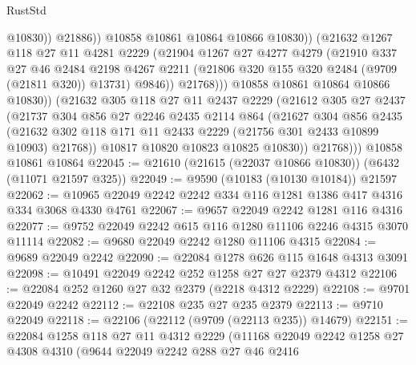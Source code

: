 \begin{lexlean}{RustStd}
\begin{coremodule}
                            @10830))
                        @21886))
                    @10858
                    @10861
                    @10864
                    @10866
                    @10830))
                (@21632
                  @1267
                  @118
                  @27
                  @11
                  @4281
                  @2229
                  (@21904
                    @1267
                    @27
                    @4277
                    @4279
                    (@21910
                      @337
                      @27
                      @46
                      @2484
                      @2198
                      @4267
                      @2211
                      (@21806 @320 @155 @320 @2484 (@9709 (@21811 @320)) @13731)
                      @9846))
                  @21768)))
            @10858
            @10861
            @10864
            @10866
            @10830))
        (@21632
          @305
          @118
          @27
          @11
          @2437
          @2229
          (@21612
            @305
            @27
            @2437
            (@21737
              @304
              @856
              @27
              @2246
              @2435
              @2114
              @864
              (@21627
                @304
                @856
                @2435
                (@21632 @302 @118 @171 @11 @2433 @2229 (@21756 @301 @2433 @10899 @10903) @21768))
              @10817
              @10820
              @10823
              @10825
              @10830))
          @21768)))
    @10858
    @10861
    @10864
@22045 := @21610 (@21615 (@22037 @10866 @10830)) (@6432 (@11071 @21597 @325))
@22049 := @9590 (@10183 (@10130 @10184)) @21597
@22062 := @10965 @22049 @2242 @2242 @334 @116 @1281 @1386 @417 @4316 @334 @3068 @4330 @4761
@22067 := @9657 @22049 @2242 @1281 @116 @4316
@22077 := @9752 @22049 @2242 @615 @116 @1280 @11106 @2246 @4315 @3070 @11114
@22082 := @9680 @22049 @2242 @1280 @11106 @4315
@22084 := @9689 @22049 @2242
@22090 := @22084 @1278 @626 @115 @1648 @4313 @3091
@22098 := @10491 @22049 @2242 @252 @1258 @27 @27 @2379 @4312
@22106 := @22084 @252 @1260 @27 @32 @2379 (@2218 @4312 @2229)
@22108 := @9701 @22049 @2242
@22112 := @22108 @235 @27 @235 @2379
@22113 := @9710 @22049
@22118 := @22106 (@22112 (@9709 (@22113 @235)) @14679)
@22151 := @22084
    @1258
    @118
    @27
    @11
    @4312
    @2229
    (@11168
      @22049
      @2242
      @1258
      @27
      @4308
      @4310
      (@9644
        @22049
        @2242
        @288
        @27
        @46
        @2416

\end{coremodule}
\end{lexlean}

